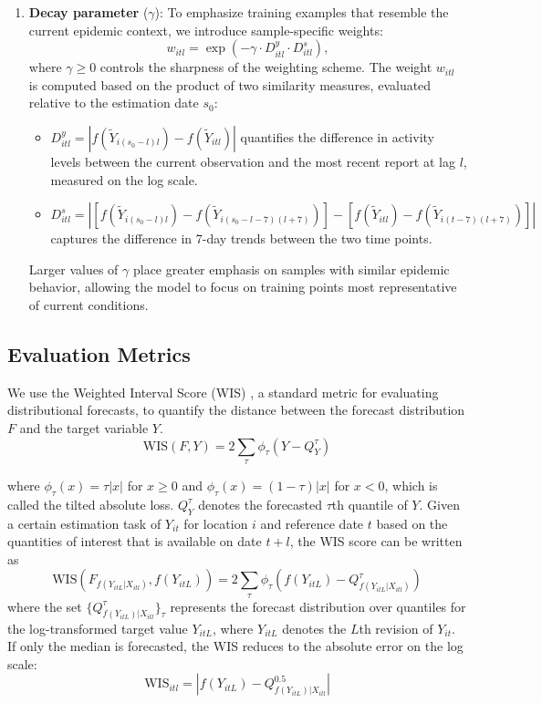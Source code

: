 \begin{enumerate}
    \item \textbf{Decay parameter} ($\gamma$): To emphasize training examples that resemble the current epidemic context, we introduce sample-specific weights:
    \[
    w_{itl} = \exp(-\gamma \cdot D^y_{itl} \cdot D^s_{itl}),
    \]
    where $\gamma \geq 0$ controls the sharpness of the weighting scheme. The weight $w_{itl}$ is computed based on the product of two similarity measures, evaluated relative to the estimation date $s_0$:
    \begin{itemize}
        \item $D^y_{itl} = \left|f(\widetilde{Y}_{i(s_0 - l) l}) - f(\widetilde{Y}_{itl})\right|$ quantifies the difference in activity levels between the current observation and the most recent report at lag $l$, measured on the log scale.
        \item $D^s_{itl} = \left|[f(\widetilde{Y}_{i(s_0 - l) l}) - f(\widetilde{Y}_{i(s_0 - l - 7)(l + 7)})] - [f(\widetilde{Y}_{itl}) - f(\widetilde{Y}_{i(t - 7)(l + 7)})]\right|$ captures the difference in 7-day trends between the two time points.
    \end{itemize}
    Larger values of $\gamma$ place greater emphasis on samples with similar epidemic behavior, allowing the model to focus on training points most representative of current conditions.
    
\end{enumerate}


\subsection{Evaluation Metrics}
We use the Weighted Interval Score (WIS) \cite{gneiting2007strictly}, a standard metric for evaluating distributional forecasts, to quantify the distance between the forecast distribution $F$ and the target variable $Y$.
$$
    \mbox{WIS}(F, Y) = 2\sum_{\tau}\phi_{\tau}(Y-Q_Y^{\tau})
$$

where $\phi_{\tau}(x) = \tau|x|$ for $x\geq 0$ and $\phi_{\tau}(x) = (1-\tau)|x|$ for $x<0$, which is called the tilted absolute loss\cite{mcdonald2021can}. $Q_Y^{\tau}$ denotes the forecasted $\tau$th quantile of $Y$. Given a certain estimation task of $Y_{it}$ for location $i$ and reference date $t$ based on the quantities of interest that is available on date $t+l$, the WIS score can be written as 
$$
    \mbox{WIS}(F_{f(Y_{itL}|X_{itl})}, f(Y_{itL})) = 2\sum_{\tau}\phi_{\tau}(f(Y_{itL}) - Q_{f(Y_{itL}|X_{itl})}^{\tau})
$$
where the set $\{ Q_{f(Y_{itL})|X_{itl}}^{\tau} \}_{\tau}$ represents the forecast distribution over quantiles for the log-transformed target value $Y_{itL}$, where $Y_{itL}$ denotes the $L$th revision of $Y_{it}$. If only the median is forecasted, the WIS reduces to the absolute error on the log scale:
$$ \text{WIS}_{itl} = |f(Y_{itL}) - Q_{f(Y_{itL})|X_{itl}}^{0.5} |  $$

